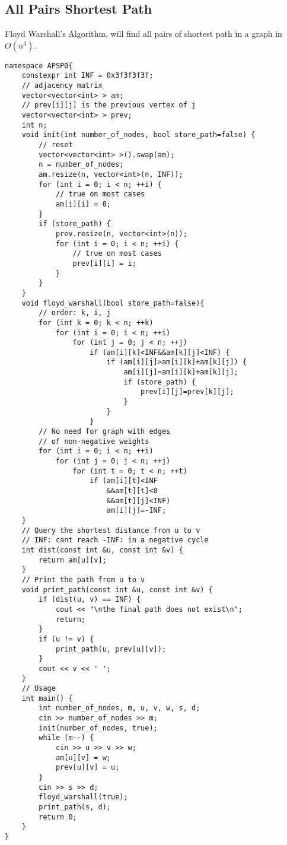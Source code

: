 \documentclass[10pt]{article}{\twocolumn}
\begin{document}
\subsection{All Pairs Shortest Path}
Floyd Warshall's Algorithm, will find all pairs of shortest path in a graph in $O(n^3)$.
\begin{lstlisting}
namespace APSP0{
    constexpr int INF = 0x3f3f3f3f;
    // adjacency matrix
    vector<vector<int> > am;
    // prev[i][j] is the previous vertex of j
    vector<vector<int> > prev;
    int n;
    void init(int number_of_nodes, bool store_path=false) {
        // reset
        vector<vector<int> >().swap(am);
        n = number_of_nodes;
        am.resize(n, vector<int>(n, INF));
        for (int i = 0; i < n; ++i) {
            // true on most cases
            am[i][i] = 0;
        }
        if (store_path) {
            prev.resize(n, vector<int>(n));
            for (int i = 0; i < n; ++i) {
                // true on most cases
                prev[i][i] = i;
            }
        }
    }
    void floyd_warshall(bool store_path=false){
        // order: k, i, j
        for (int k = 0; k < n; ++k)
            for (int i = 0; i < n; ++i)
                for (int j = 0; j < n; ++j)
                    if (am[i][k]<INF&&am[k][j]<INF) {
                        if (am[i][j]>am[i][k]+am[k][j]) {
                            am[i][j]=am[i][k]+am[k][j];
                            if (store_path) {
                                prev[i][j]=prev[k][j];
                            }
                        }
                    }
        // No need for graph with edges 
        // of non-negative weights
        for (int i = 0; i < n; ++i)
            for (int j = 0; j < n; ++j)
                for (int t = 0; t < n; ++t)
                    if (am[i][t]<INF
                        &&am[t][t]<0
                        &&am[t][j]<INF)
                        am[i][j]=-INF;
    }
    // Query the shortest distance from u to v
    // INF: cant reach -INF: in a negative cycle
    int dist(const int &u, const int &v) {
        return am[u][v];
    }
    // Print the path from u to v
    void print_path(const int &u, const int &v) {
        if (dist(u, v) == INF) {
            cout << "\nthe final path does not exist\n";
            return;
        }
        if (u != v) {
            print_path(u, prev[u][v]);
        }
        cout << v << ' ';
    }
    // Usage
    int main() {
        int number_of_nodes, m, u, v, w, s, d;
        cin >> number_of_nodes >> m;
        init(number_of_nodes, true);
        while (m--) {
            cin >> u >> v >> w;
            am[u][v] = w;
            prev[u][v] = u;
        }
        cin >> s >> d;
        floyd_warshall(true);
        print_path(s, d);
        return 0;
    }
}
\end{lstlisting}
\end{document}
